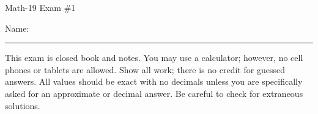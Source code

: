 \documentclass[letterpaper,12pt,fleqn]{article}
\begin{document}
\begin{center}
\Large Math-19 Exam \#1
\end{center}

\vspace{0.5in}

Name: \rule{4in}{1pt}

\vspace{0.5in}

This exam is closed book and notes. You may use a calculator; however, no cell
phones or tablets are allowed. Show all work; there is no credit for guessed
answers. All values should be exact with no decimals unless you are
specifically asked for an approximate or decimal answer. Be careful to check
for extraneous solutions.

\vspace{0.5in}

\newcommand{\fillin}{\rule[-6pt]{3in}{1pt}}
\newcommand{\sfillin}{\rule[-6pt]{1in}{1pt}}
\end{document}
